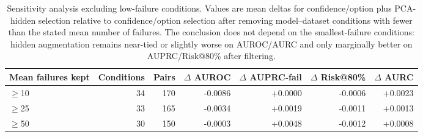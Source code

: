 
\begin{table}[t]
\centering
\small
\caption{Sensitivity analysis excluding low-failure conditions. Values are mean deltas for confidence/option plus PCA-hidden selection relative to confidence/option selection after removing model--dataset conditions with fewer than the stated mean number of failures. The conclusion does not depend on the smallest-failure conditions: hidden augmentation remains near-tied or slightly worse on AUROC/AURC and only marginally better on AUPRC/Risk@80\% after filtering.}
\label{tab:low-failure-sensitivity}
\begin{adjustbox}{max width=\textwidth}
\begin{tabular}{lrrrrrr}
\toprule
Mean failures kept & Conditions & Pairs & $\Delta$ AUROC & $\Delta$ AUPRC-fail & $\Delta$ Risk@80\% & $\Delta$ AURC \\
\midrule
$\geq$10 & 34 & 170 & -0.0086 & +0.0000 & -0.0006 & +0.0023 \\
$\geq$25 & 33 & 165 & -0.0034 & +0.0019 & -0.0011 & +0.0013 \\
$\geq$50 & 30 & 150 & -0.0003 & +0.0048 & -0.0012 & +0.0008 \\
\bottomrule
\end{tabular}
\end{adjustbox}
\end{table}
